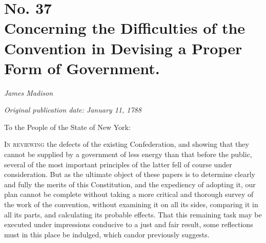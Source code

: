 \chapter[No. 37: Concerning the Difficulties of the Convention in Devising a Proper Form of Government.]{No. 37\\ {\small Concerning the Difficulties of the Convention in Devising a Proper Form of Government.}}

\textit{James Madison}

\textit{Original publication date: January 11, 1788}
\vspace{1cm}

To the People of the State of New York:
\vspace{.4cm}

\textsc{In reviewing} the defects of the existing Confederation, and showing that they cannot be supplied by a government of less energy than that before the public, several of the most important principles of the latter fell of course under consideration. 
But as the ultimate object of these papers is to determine clearly and fully the merits of this Constitution, and the expediency of adopting it, our plan cannot be complete without taking a more critical and thorough survey of the work of the convention, without examining it on all its sides, comparing it in all its parts, and calculating its probable effects. 
That this remaining task may be executed under impressions conducive to a just and fair result, some reflections must in this place be indulged, which candor previously suggests.

